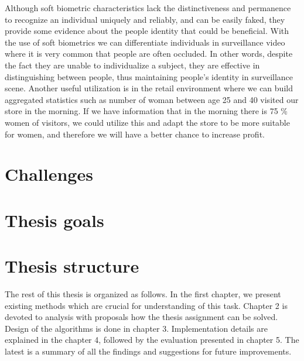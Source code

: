 \begin{introduction}
    Although soft biometric characteristics lack the distinctiveness and permanence to recognize an individual uniquely and reliably, and can be easily faked, they provide some evidence about the people identity that could be beneficial. With the use of soft biometrics we can differentiate individuals in surveillance video where it is very common that people are often occluded. In other words, despite the fact they are unable to individualize a subject, they are effective in distinguishing between people, thus maintaining people's identity in surveillance scene. Another useful utilization is in the retail environment where we can build aggregated statistics such as number of woman between age 25 and 40 visited our store in the morning. If we have information that in the morning there is 75 \% women of visitors, we could utilize this and adapt the store to be more suitable for women, and therefore we will have a better chance to increase profit.
    
    \section{Challenges}
    \section{Thesis goals}
    \section{Thesis structure}
    The rest of this thesis is organized as follows. In the first chapter, we present existing methods which are crucial for understanding of this task. Chapter 2 is devoted to analysis with proposals how the thesis assignment can be solved. Design of the algorithms is done in chapter 3. Implementation details are explained in the chapter 4, followed by the evaluation presented in chapter 5. The latest is a summary of all the findings and suggestions for future improvements.
    
\end{introduction}